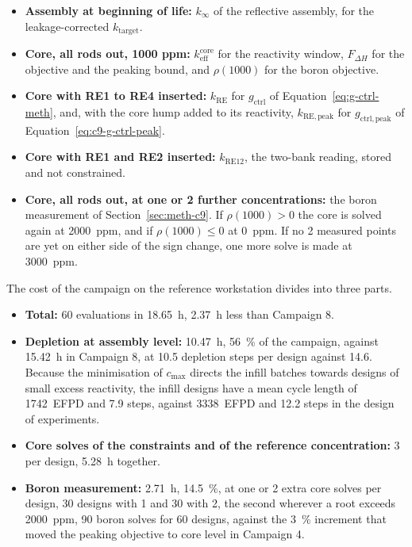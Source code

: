 \begin{itemize}
  \item \textbf{Assembly at beginning of life:} $k_\infty$ of the
        reflective assembly, for the leakage-corrected $k_\mathrm{target}$.
  \item \textbf{Core, all rods out, 1000 ppm:}
        $k_\mathrm{eff}^\mathrm{core}$ for the reactivity window,
        $F_{\Delta H}$ for the objective and the peaking bound,
        and $\rho(1000)$ for the boron objective.
  \item \textbf{Core with RE1 to RE4 inserted:} $k_\mathrm{RE}$
        for $g_\mathrm{ctrl}$ of Equation~\eqref{eq:g-ctrl-meth}, and,
        with the core hump added to its reactivity, $k_\mathrm{RE,peak}$
        for $g_\mathrm{ctrl,peak}$ of Equation~\eqref{eq:c9-g-ctrl-peak}.
  \item \textbf{Core with RE1 and RE2 inserted:} $k_\mathrm{RE12}$,
        the two-bank reading, stored and not constrained.
  \item \textbf{Core, all rods out, at one or 2 further
        concentrations:} the boron measurement of
        Section~\ref{sec:meth-c9}. If $\rho(1000) > 0$ the core is
        solved again at \SI{2000}{ppm}, and if $\rho(1000) \le 0$ at
        \SI{0}{ppm}. If no 2 measured points are yet on either side
        of the sign change, one more solve is made at \SI{3000}{ppm}.

\end{itemize}

The cost of the campaign on the reference workstation divides into
three parts.

\begin{itemize}
  \item \textbf{Total:} 60 evaluations in \SI{18.65}{h}, \SI{2.37}{h}
        less than Campaign 8.
  \item \textbf{Depletion at assembly level:} \SI{10.47}{h}, \SI{56}{\%}
        of the campaign, against \SI{15.42}{h} in Campaign 8, at 10.5
        depletion steps per design against 14.6. Because the
        minimisation of $c_\mathrm{max}$ directs the infill batches
        towards designs of small excess reactivity, the infill designs
        have a mean cycle length of \SI{1742}{EFPD} and 7.9 steps,
        against \SI{3338}{EFPD} and 12.2 steps in the design of
        experiments.
  \item \textbf{Core solves of the constraints and of the reference
        concentration:} 3 per design, \SI{5.28}{h} together.
    \item \textbf{Boron measurement:} \SI{2.71}{h}, \SI{14.5}{\%}, at one
        or 2 extra core solves per design, 30 designs with 1 and 30
        with 2, the second wherever a root exceeds \SI{2000}{ppm}, 90
        boron solves for 60 designs, against the \SI{3}{\%} increment
        that moved the peaking objective to core level in Campaign 4.
\end{itemize}

